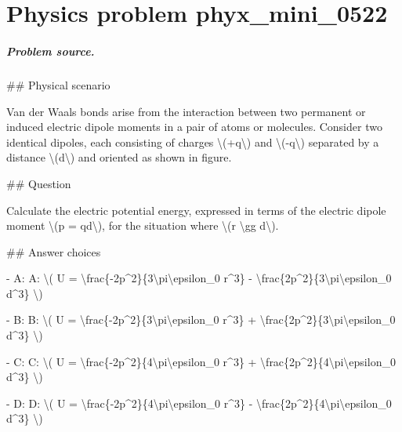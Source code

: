 
\chapter{Physics problem phyx\_mini\_0522}
\label{ch:PhyXMiniProblems_problem_phyx_mini_0522}

\paragraph{Problem source.}
\#\# Physical scenario

Van der Waals bonds arise from the interaction between two permanent or induced electric dipole moments in a pair of atoms or molecules. Consider two identical dipoles, each consisting of charges \textbackslash{}(+q\textbackslash{}) and \textbackslash{}(-q\textbackslash{}) separated by a distance \textbackslash{}(d\textbackslash{}) and oriented as shown in figure.

\#\# Question

Calculate the electric potential energy, expressed in terms of the electric dipole moment \textbackslash{}(p = qd\textbackslash{}), for the situation where \textbackslash{}(r \textbackslash{}gg d\textbackslash{}).

\#\# Answer choices

- A: A: \textbackslash{}( U = \textbackslash{}frac\{-2p\textasciicircum{}2\}\{3\textbackslash{}pi\textbackslash{}epsilon\_0 r\textasciicircum{}3\} - \textbackslash{}frac\{2p\textasciicircum{}2\}\{3\textbackslash{}pi\textbackslash{}epsilon\_0 d\textasciicircum{}3\} \textbackslash{})

- B: B: \textbackslash{}( U = \textbackslash{}frac\{-2p\textasciicircum{}2\}\{3\textbackslash{}pi\textbackslash{}epsilon\_0 r\textasciicircum{}3\} + \textbackslash{}frac\{2p\textasciicircum{}2\}\{3\textbackslash{}pi\textbackslash{}epsilon\_0 d\textasciicircum{}3\} \textbackslash{})

- C: C: \textbackslash{}( U = \textbackslash{}frac\{-2p\textasciicircum{}2\}\{4\textbackslash{}pi\textbackslash{}epsilon\_0 r\textasciicircum{}3\} + \textbackslash{}frac\{2p\textasciicircum{}2\}\{4\textbackslash{}pi\textbackslash{}epsilon\_0 d\textasciicircum{}3\} \textbackslash{})

- D: D: \textbackslash{}( U = \textbackslash{}frac\{-2p\textasciicircum{}2\}\{4\textbackslash{}pi\textbackslash{}epsilon\_0 r\textasciicircum{}3\} - \textbackslash{}frac\{2p\textasciicircum{}2\}\{4\textbackslash{}pi\textbackslash{}epsilon\_0 d\textasciicircum{}3\} \textbackslash{})

